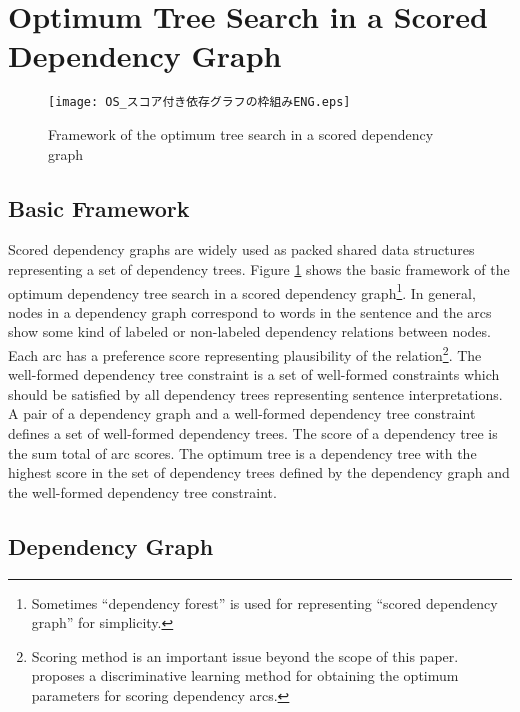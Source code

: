 \section{Optimum Tree Search in a Scored Dependency Graph}
\label{sec:OptimumTreeSearchForDependencyGraph}

 \begin{figure}[tb]
 \begin{center}
     \texttt{[image: OS\_スコア付き依存グラフの枠組みENG.eps]}
 \end{center}
\myfiglabelskippre
\caption{Framework of the optimum tree search in a scored dependency graph}
\label{fig:ScoreAddedDependencyGraph}
\end{figure}

\subsection{Basic Framework}

Scored dependency graphs are widely used as packed shared data
structures representing a set of dependency trees. Figure
\ref{fig:ScoreAddedDependencyGraph} shows the basic framework of the
optimum dependency tree search in a scored dependency
graph\footnote{Sometimes ``dependency forest'' is used for representing
``scored dependency graph'' for simplicity.}. In general, nodes in a
dependency graph correspond to words in the sentence and the arcs show
some kind of labeled or non-labeled dependency relations between
nodes. Each arc has a preference score representing plausibility of
the relation\footnote{Scoring method is an important issue beyond the
scope of this paper.  \cite{McDonald05} proposes a discriminative
learning method for obtaining the optimum parameters for scoring
dependency arcs.}. The well-formed dependency tree constraint is a set
of well-formed constraints which should be satisfied by all dependency
trees representing sentence interpretations. A pair of a dependency
graph and a well-formed dependency tree constraint defines a set of
well-formed dependency trees. The score of a dependency tree is the
sum total of arc scores. The optimum tree is a dependency tree with
the highest score in the set of dependency trees defined by the
dependency graph and the well-formed dependency tree constraint.

\subsection{Dependency Graph}
\label{sec:DependencyGraph}

